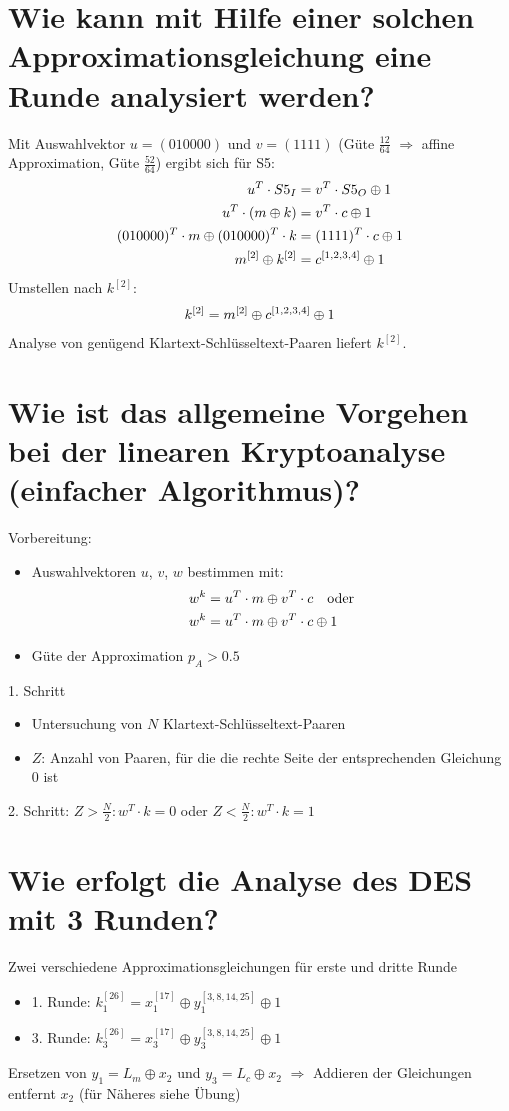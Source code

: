 \documentclass{article}
\begin{document}
	\section*{Wie kann mit Hilfe einer solchen Approximationsgleichung eine Runde analysiert werden?}
	Mit Auswahlvektor $u=(010000)$ und $v=(1111)$ (Güte $\frac{12}{64}$ $\Rightarrow$ affine Approximation, Güte $\frac{52}{64}$) ergibt sich für S5:
	\begin{align}
		u^T\cdot S5_I &= v^T\cdot S5_O \oplus 1 \notag \\
		u^T\cdot (m\oplus k) &= v^T\cdot c \oplus 1 \notag \\
		(010000)^T\cdot m \oplus (010000)^T \cdot k &= (1111)^T \cdot c \oplus 1 \notag \\
		m^{[2]} \oplus k^{[2]} &= c^{[1,2,3,4]} \oplus 1 \notag
	\end{align}
	Umstellen nach $k^{[2]}$:
	\begin{align}
		k^{[2]} = m^{[2]} \oplus c^{[1,2,3,4]} \oplus 1 \notag
	\end{align}
	Analyse von genügend Klartext-Schlüsseltext-Paaren liefert $k^{[2]}$.
	
	\section*{Wie ist das allgemeine Vorgehen bei der linearen Kryptoanalyse (einfacher Algorithmus)?}
	Vorbereitung:
	\begin{itemize}
		\item Auswahlvektoren $u$, $v$, $w$ bestimmen mit:
		\begin{align}
			w^k &= u^T\cdot m \oplus v^T\cdot c \quad\text{oder} \notag \\
			w^k &= u^T\cdot m \oplus v^T\cdot c \oplus 1 \notag
		\end{align}
		\item Güte der Approximation $p_A > 0.5$
	\end{itemize}
	1. Schritt
	\begin{itemize}
		\item Untersuchung von $N$ Klartext-Schlüsseltext-Paaren
		\item $Z$: Anzahl von Paaren, für die die rechte Seite der entsprechenden Gleichung 0 ist
	\end{itemize}
	2. Schritt: $Z > \frac{N}{2}: w^T\cdot k = 0$ oder $Z < \frac{N}{2}: w^T\cdot k = 1$
	
	\section*{Wie erfolgt die Analyse des DES mit 3 Runden?}
	Zwei verschiedene Approximationsgleichungen für erste und dritte Runde
	\begin{itemize}
		\item 1. Runde: $k_1^{[26]} = x_1^{[17]} \oplus y_1^{[3,8,14,25]} \oplus 1$
		\item 3. Runde: $k_3^{[26]} = x_3^{[17]} \oplus y_3^{[3,8,14,25]} \oplus 1$
	\end{itemize}
	Ersetzen von $y_1 = L_m \oplus x_2$ und $y_3 = L_c \oplus x_2$ $\Rightarrow$ Addieren der Gleichungen entfernt $x_2$ (für Näheres siehe Übung)
	
\end{document}
